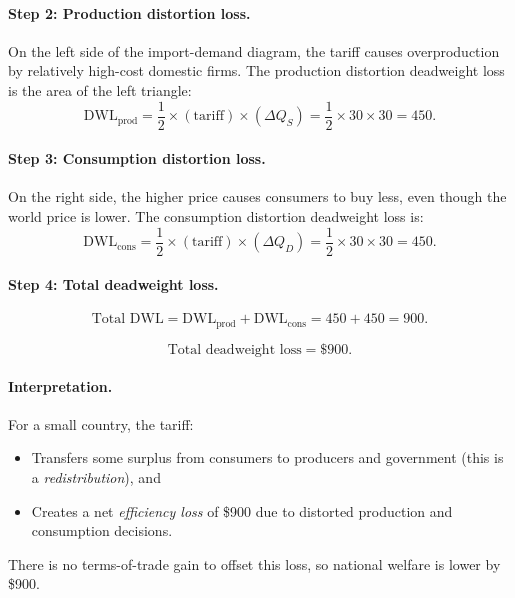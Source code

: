 \documentclass[12pt]{article}
\begin{document}
\paragraph{Step 2: Production distortion loss.}
On the left side of the import-demand diagram, the tariff causes overproduction by relatively high-cost domestic firms.  
The production distortion deadweight loss is the area of the left triangle:
\[
\text{DWL}_{\text{prod}} = \frac{1}{2} \times (\text{tariff}) \times (\Delta Q_S)
= \frac{1}{2} \times 30 \times 30 = 450.
\]

\paragraph{Step 3: Consumption distortion loss.}
On the right side, the higher price causes consumers to buy less, even though the world price is lower.  
The consumption distortion deadweight loss is:
\[
\text{DWL}_{\text{cons}} = \frac{1}{2} \times (\text{tariff}) \times (\Delta Q_D)
= \frac{1}{2} \times 30 \times 30 = 450.
\]

\paragraph{Step 4: Total deadweight loss.}
\[
\text{Total DWL} = \text{DWL}_{\text{prod}} + \text{DWL}_{\text{cons}} = 450 + 450 = 900.
\]

\[
\boxed{\text{Total deadweight loss} = \$900.}
\]

\paragraph{Interpretation.}
For a small country, the tariff:
\begin{itemize}
    \item Transfers some surplus from consumers to producers and government (this is a \emph{redistribution}), and
    \item Creates a net \emph{efficiency loss} of \$900 due to distorted production and consumption decisions.
\end{itemize}
There is no terms-of-trade gain to offset this loss, so national welfare is lower by \$900.
\end{document}
